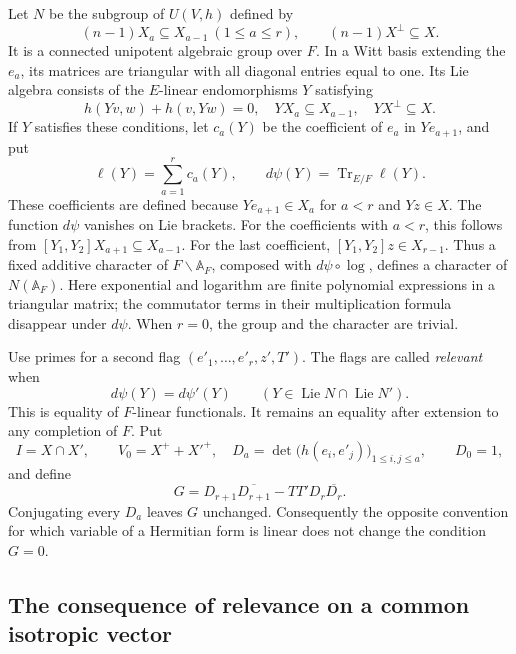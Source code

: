 Let $N$ be the subgroup of $U(V,h)$ defined by
\[
 (n-1)X_a\subseteq X_{a-1}\ (1\leq a\leq r),
 \qquad (n-1)X^\perp\subseteq X.
\]
It is a connected unipotent algebraic group over $F$.  In a Witt
basis extending the $e_a$, its matrices are triangular with all
diagonal entries equal to one.  Its Lie algebra consists of the
$E$-linear endomorphisms $Y$ satisfying
\begin{equation}\label{df-lie}
 h(Yv,w)+h(v,Yw)=0,\quad
 YX_a\subseteq X_{a-1},\quad YX^\perp\subseteq X.
\end{equation}
If $Y$ satisfies these conditions, let $c_a(Y)$ be the coefficient
of $e_a$ in $Ye_{a+1}$, and put
\begin{equation}\label{df-differential}
 \ell(Y)=\sum_{a=1}^r c_a(Y),\qquad
 d\psi(Y)=\operatorname{Tr}_{E/F}\ell(Y).
\end{equation}
These coefficients are defined because $Ye_{a+1}\in X_a$ for
$a<r$ and $Yz\in X$.  The function $d\psi$ vanishes on Lie
brackets.  For the coefficients with $a<r$, this follows from
$[Y_1,Y_2]X_{a+1}\subseteq X_{a-1}$.  For the last coefficient,
$[Y_1,Y_2]z\in X_{r-1}$.  Thus a fixed additive character of
$F\backslash\mathbb A_F$, composed with $d\psi\circ\log$, defines
a character of $N(\mathbb A_F)$.  Here exponential and logarithm
are finite polynomial expressions in a triangular matrix; the
commutator terms in their multiplication formula disappear under
$d\psi$.  When $r=0$, the group and the character are trivial.

Use primes for a second flag $(e'_1,\ldots,e'_r,z',T')$.  The flags
are called \emph{relevant} when
\begin{equation}\label{df-relevance}
 d\psi(Y)=d\psi'(Y)
 \qquad(Y\in\operatorname{Lie}N\cap\operatorname{Lie}N').
\end{equation}
This is equality of $F$-linear functionals.  It remains an equality
after extension to any completion of $F$.
Put
\[
 I=X\cap X',\qquad V_0=X^++X'^+,
 \quad
 D_a=\det\bigl(h(e_i,e'_j)\bigr)_{1\leq i,j\leq a},
 \qquad D_0=1,
\]
and define
\begin{equation}\label{df-G}
 G=D_{r+1}\overline{D_{r+1}}-TT'D_r\overline{D_r}.
\end{equation}
Conjugating every $D_a$ leaves $G$ unchanged.  Consequently the
opposite convention for which variable of a Hermitian form is linear
does not change the condition $G=0$.

\subsection{The consequence of relevance on a common isotropic vector}

